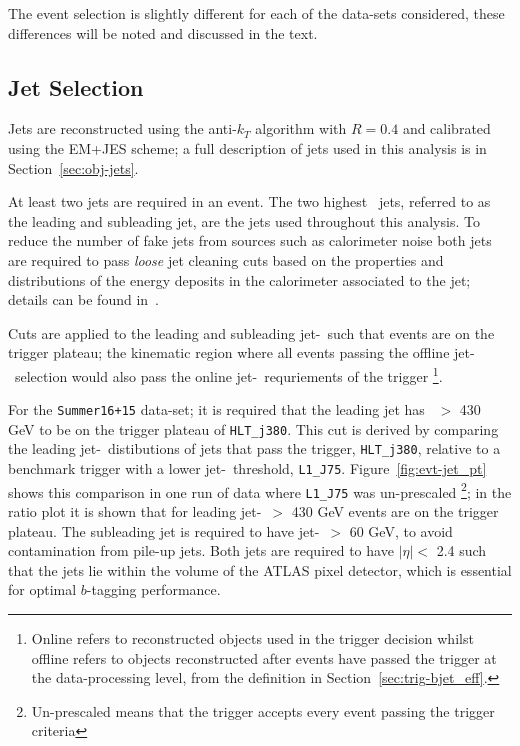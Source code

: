 The event selection is slightly different for each of the data-sets considered,
these differences will be noted and discussed in the text.

\subsection{Jet Selection}
\label{sec:evt-sel-jets}

Jets are reconstructed using the anti-$k_T$ algorithm with $R=0.4$
and calibrated using the EM+JES scheme;
a full description of jets used in this analysis is in Section~\ref{sec:obj-jets}.

At least two jets are required in an event.
The two highest \pT~jets, referred to as the leading and subleading jet,
are the jets used throughout this analysis.
To reduce the number of fake jets from sources such as calorimeter noise
both jets are required to pass \textit{loose} jet cleaning cuts
based on the properties and distributions of the energy deposits in the calorimeter associated to the jet;
details can be found in~\cite{evt-jet_cleaning}.

Cuts are applied to the leading and subleading jet-\pT~such that events are on the trigger plateau;
the kinematic region where all events passing the offline jet-\pT~selection
would also pass the online jet-\pT~requriements of the trigger
\footnote{Online refers to reconstructed objects used in the trigger decision
  whilst offline refers to objects reconstructed after events have passed the trigger at the data-processing level,
  from the definition in Section~\ref{sec:trig-bjet_eff}.}.

For the \verb|Summer16+15| data-set; it is required that the leading jet has \pT~$>$ 430 GeV to be on the trigger plateau of \verb|HLT_j380|.
This cut is derived by comparing the leading jet-\pT~distibutions of jets that pass the trigger, \verb|HLT_j380|,
relative to a benchmark trigger with a lower jet-\pT~threshold, \verb|L1_J75|.
Figure~\ref{fig:evt-jet_pt} shows this comparison in one run of data where \verb|L1_J75| was un-prescaled
\footnote{Un-prescaled means that the trigger accepts every event passing the trigger criteria};
in the ratio plot it is shown that for leading jet-\pT~$>$ 430 GeV events are on the trigger plateau.
The subleading jet is required to have jet-\pT~$>$ 60 GeV,
to avoid contamination from pile-up jets.
Both jets  are required to have $|\eta| <$ 2.4
such that the jets lie within the volume of the ATLAS pixel detector,
which is essential for optimal $b$-tagging performance.

